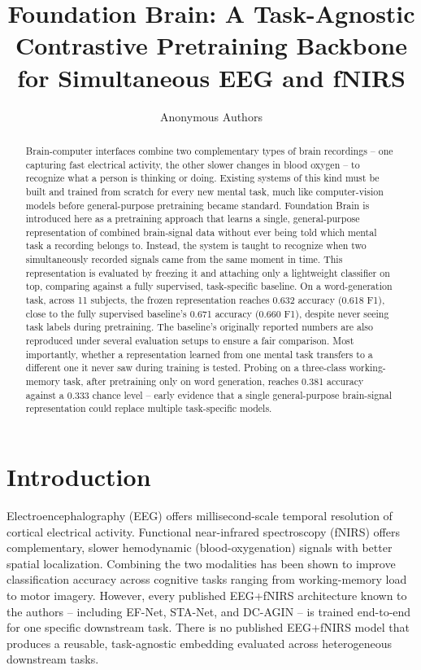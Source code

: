 \documentclass[journal]{IEEEtran}
\begin{document}
\title{Foundation Brain: A Task-Agnostic Contrastive Pretraining Backbone for Simultaneous EEG and fNIRS}

\author{Anonymous Authors}


\maketitle
\thispagestyle{empty}
\pagestyle{empty}

\begin{abstract}
Brain-computer interfaces combine two complementary types of brain recordings -- one capturing fast electrical activity, the other slower changes in blood oxygen -- to recognize what a person is thinking or doing. Existing systems of this kind must be built and trained from scratch for every new mental task, much like computer-vision models before general-purpose pretraining became standard. Foundation Brain is introduced here as a pretraining approach that learns a single, general-purpose representation of combined brain-signal data without ever being told which mental task a recording belongs to. Instead, the system is taught to recognize when two simultaneously recorded signals came from the same moment in time. This representation is evaluated by freezing it and attaching only a lightweight classifier on top, comparing against a fully supervised, task-specific baseline. On a word-generation task, across 11 subjects, the frozen representation reaches 0.632 accuracy (0.618 F1), close to the fully supervised baseline's 0.671 accuracy (0.660 F1), despite never seeing task labels during pretraining. The baseline's originally reported numbers are also reproduced under several evaluation setups to ensure a fair comparison. Most importantly, whether a representation learned from one mental task transfers to a different one it never saw during training is tested. Probing on a three-class working-memory task, after pretraining only on word generation, reaches 0.381 accuracy against a 0.333 chance level -- early evidence that a single general-purpose brain-signal representation could replace multiple task-specific models.
\end{abstract}

\section{Introduction}
Electroencephalography (EEG) offers millisecond-scale temporal resolution of cortical electrical activity. Functional near-infrared spectroscopy (fNIRS) offers complementary, slower hemodynamic (blood-oxygenation) signals with better spatial localization. Combining the two modalities has been shown to improve classification accuracy across cognitive tasks ranging from working-memory load to motor imagery. However, every published EEG+fNIRS architecture known to the authors -- including EF-Net, STA-Net, and DC-AGIN -- is trained end-to-end for one specific downstream task. There is no published EEG+fNIRS model that produces a reusable, task-agnostic embedding evaluated across heterogeneous downstream tasks.
\end{document}

